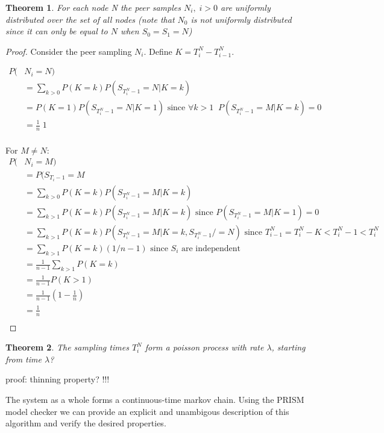 \documentclass[a4paper,10pt]{article}
\newtheorem*{thm}{Theorem}
\begin{document}
\begin{thm}For each node N the peer samples $N_i, \; i>0$ are uniformly distributed over the set of all nodes (note that $N_0$ is not uniformly distributed since it can only be equal to $N$ when $S_0 = S_1 = N$)\end{thm}

\begin{proof}
Consider the peer sampling $N_i$. Define $K = T^N_i - T^N_{i-1}$.

\begin{align*}
P(&N_i = N) \\
& = \sum_{k>0} P(K=k) P(S_{T^N_i-1}=N | K=k) \\
& = P(K=1) P(S_{T^N_i-1}=N | K=1) \text{ since $\forall k>1 \;\; P(S_{T^N_i-1}=M | K=k) = 0$} \\
& = \frac{1}{n} \; 1 \\
\end{align*}

\noindent For $M \neq N$: \\
\begin{align*}
P(&N_i = M) \\
& = P(S_{T_i-1} = M \\
& = \sum_{k>0} P(K=k) P(S_{T^N_i-1}=M | K=k) \\
& = \sum_{k>1} P(K=k) P(S_{T^N_i-1}=M | K=k) \text{ since $P(S_{T^N_i-1}=M | K=1) = 0$} \\
& = \sum_{k>1} P(K=k) P(S_{T^N_i-1}=M | K=k, S_{T^N_i-1} /= N) \text{ since $T^N_{i-1} = T^N_i - K < T^N_i-1 < T^N_i$} \\
& = \sum_{k>1} P(K=k) (1 / n-1) \text{ since $S_i$ are independent} \\
& = \frac{1}{n-1} \sum_{k>1} P(K=k) \\
& = \frac{1}{n-1} P(K>1) \\
& = \frac{1}{n-1} (1 - \frac{1}{n}) \\
& = \frac{1}{n} \\
\end{align*}

\end{proof}

\begin{thm}The sampling times $T^N_i$ form a poisson process with rate $\lambda$, starting from time $\lambda$?\end{thm}

proof: thinning property? !!!

The system as a whole forms a continuous-time markov chain. Using the PRISM model checker we can provide an explicit and unambigous description of this algorithm and verify the desired properties.
\end{document}
